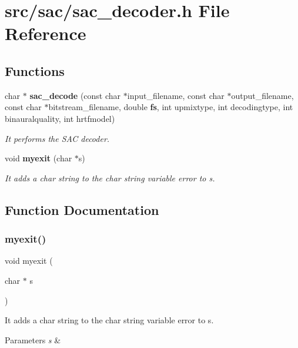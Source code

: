 \section{src/sac/sac\+\_\+decoder.h File Reference}
\label{sac__decoder_8h}
\subsection*{Functions}
\begin{DoxyCompactItemize}
\item 
char $\ast$ \textbf{ sac\+\_\+decode} (const char $\ast$input\+\_\+filename, const char $\ast$output\+\_\+filename, const char $\ast$bitstream\+\_\+filename, double \textbf{ fs}, int upmixtype, int decodingtype, int binauralquality, int hrtfmodel)
\begin{DoxyCompactList}\small\item\em It performs the S\+AC decoder. \end{DoxyCompactList}\item 
void \textbf{ myexit} (char $\ast$s)
\begin{DoxyCompactList}\small\item\em It adds a char string to the char string variable error to s. \end{DoxyCompactList}\end{DoxyCompactItemize}


\subsection{Function Documentation}
\mbox{\label{sac__decoder_8h_a1efe95896d527718ed12c338bbcbb2a7}} 
\subsubsection{myexit()}
{\footnotesize\ttfamily void myexit (\begin{DoxyParamCaption}\item[{char $\ast$}]{s }\end{DoxyParamCaption})}



It adds a char string to the char string variable error to s. 


\begin{DoxyParams}{Parameters}
{\em s} & \\
\hline
\end{DoxyParams}
\mbox{\label{sac__decoder_8h_a4fe6677b920cf674fb45b8f9229f3460}} 
